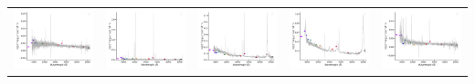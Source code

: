 \begin{center}
\begin{longtable}{l l l l l }
    \includegraphics[width=0.2\linewidth, clip]{Figs/Figs-sdss/spec-0914-52721-0103-SPLUS-n03s44-026823.pdf} & \includegraphics[width=0.2\linewidth, clip]{Figs/Figs-sdss/spec-0914-52721-0431-SPLUS-n03s43-048919.pdf} & \includegraphics[width=0.2\linewidth, clip]{Figs/Figs-sdss/spec-0981-52435-0575-STRIPE82-0102-040352.pdf} & \includegraphics[width=0.2\linewidth, clip]{Figs/Figs-sdss/spec-0982-52466-0091-STRIPE82-0103-087316.pdf} & \includegraphics[width=0.2\linewidth, clip]{Figs/Figs-sdss/spec-0982-52466-0477-STRIPE82-0103-089600.pdf} \\

\end{longtable}
\end{center}
